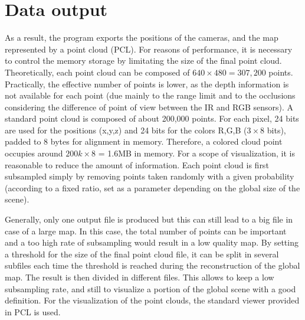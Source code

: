 \clearpage
\section{Data output}
\label{sec:data_output}

As a result, the program exports the positions of the cameras, and the map represented by a point cloud (\gls{PCL}). For reasons of performance, it is necessary to control the memory storage by limitating the size of the final point cloud. Theoretically, each point cloud can be composed of $640\times480 = 307,200$ points. Practically, the effective number of points is lower, as the depth information is not available for each point (due mainly to the range limit and to the occlusions considering the difference of point of view between the IR and RGB sensors). A standard point cloud is composed of about 200,000 points. For each pixel, 24 bits are used for the positions (x,y,z) and 24 bits for the colors R,G,B ($3\times8$ bits), padded to 8 bytes for alignment in memory. Therefore, a colored cloud point occupies around $200k\times8$ = 1.6MB in memory. For a scope of visualization, it is reasonable to reduce the amount of information. Each point cloud is first subsampled simply by removing points taken randomly with a given probability (according to a fixed ratio, set as a parameter depending on the global size of the scene).

Generally, only one output file is produced but this can still lead to a big file in case of a large map. In this case, the total number of points can be  important and a too high rate of subsampling would result in a low quality map. By setting a threshold for the size of the final point cloud file, it can be split in several subfiles each time the threshold is reached during the reconstruction of the global map. The result is then divided in different files. This allows to keep a low subsampling rate, and still to visualize a portion of the global scene with a good definition. For the visualization of the point clouds, the standard viewer provided in \gls{PCL} is used.

%
%

